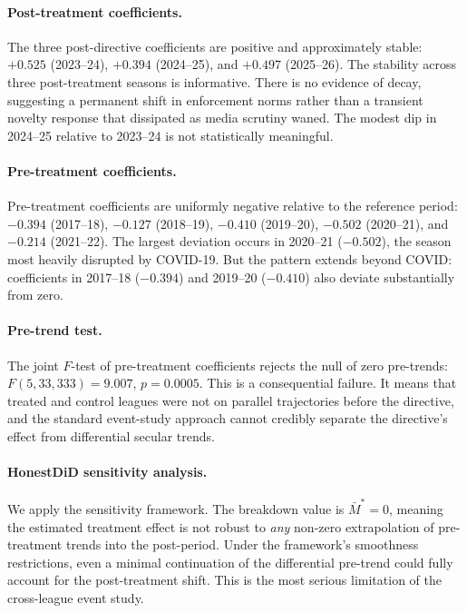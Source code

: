 \paragraph{Post-treatment coefficients.} The three post-directive coefficients are positive and approximately stable: $+0.525$ (2023--24), $+0.394$ (2024--25), and $+0.497$ (2025--26). The stability across three post-treatment seasons is informative. There is no evidence of decay, suggesting a permanent shift in enforcement norms rather than a transient novelty response that dissipated as media scrutiny waned. The modest dip in 2024--25 relative to 2023--24 is not statistically meaningful.

\paragraph{Pre-treatment coefficients.} Pre-treatment coefficients are uniformly negative relative to the reference period: $-0.394$ (2017--18), $-0.127$ (2018--19), $-0.410$ (2019--20), $-0.502$ (2020--21), and $-0.214$ (2021--22). The largest deviation occurs in 2020--21 ($-0.502$), the season most heavily disrupted by COVID-19. But the pattern extends beyond COVID: coefficients in 2017--18 ($-0.394$) and 2019--20 ($-0.410$) also deviate substantially from zero.

\paragraph{Pre-trend test.} The joint $F$-test of pre-treatment coefficients rejects the null of zero pre-trends: $F(5, 33{,}333) = 9.007$, $p = 0.0005$. This is a consequential failure. It means that treated and control leagues were not on parallel trajectories before the directive, and the standard event-study approach cannot credibly separate the directive's effect from differential secular trends.

\paragraph{HonestDiD sensitivity analysis.} We apply the \citet{roth2022pretest} sensitivity framework. The breakdown value is $\bar{M}^* = 0$, meaning the estimated treatment effect is not robust to \textit{any} non-zero extrapolation of pre-treatment trends into the post-period. Under the framework's smoothness restrictions, even a minimal continuation of the differential pre-trend could fully account for the post-treatment shift. This is the most serious limitation of the cross-league event study.

